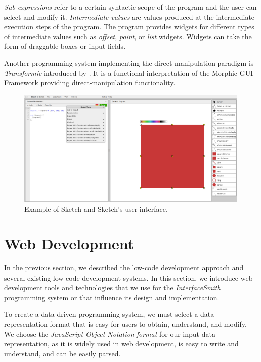\emph{Sub-expressions} refer to a certain syntactic scope of the program and the user can select and modify it.
\emph{Intermediate values} are values produced at the intermediate execution steps of the program.
The program provides widgets for different types of intermediate values such as \emph{offset}, \emph{point}, or \emph{list} widgets.
Widgets can take the form of draggable boxes or input fields.

Another programming system implementing the direct manipulation paradigm is \emph{Transformic} introduced by \citet{Schreiber_Krahn_Ingalls_Hirschfeld_2017}.
It is a functional interpretation of the Morphic GUI Framework providing direct-manipulation functionality.

\begin{figure}[htbp]
	\centering
	\includegraphics[width=1\linewidth]{img/sketch.pdf}
	\caption{Example of Sketch-and-Sketch's user interface. }
	\label{fig:sketch}
\end{figure}

\newpage
\section{Web Development}
In the previous section, we described the low-code development approach and several existing low-code development systems.
In this section, we introduce web development tools and technologies that we use for the \emph{InterfaceSmith} programming system or that influence its design and implementation.

To create a data-driven programming system, we must select a data representation format that is easy for users to obtain, understand, and modify.
We choose the \emph{JavaScript Object Notation format} for our input data representation, as it is widely used in web development, is easy to write and understand, and can be easily parsed.

